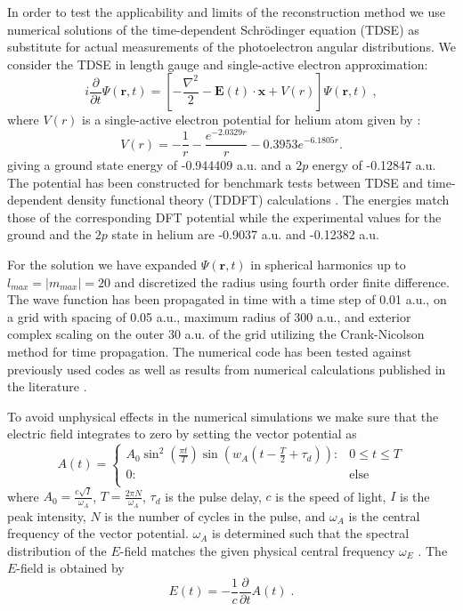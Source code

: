 In order to test the applicability and limits of the reconstruction method we use numerical solutions of the time-dependent Schr\"odinger equation (TDSE) as substitute for actual measurements of the photoelectron angular distributions. We consider the TDSE in length gauge and single-active electron approximation:
%
\begin{equation}
i\frac{\partial}{\partial t}\Psi(\mathbf{r},t) = \left[-\frac{\nabla^2}{2} - \mathbf{E}(t) \cdot \mathbf{x} + V(r)\right]\Psi(\mathbf{r},t)\; ,
\end{equation}
%
where $V(r)$ is a single-active electron potential for helium atom given by \cite{reiff2020}:
%
\begin{equation}
V(r) = -\frac{1}{r} - \frac{e^{-2.0329r}}{r} - 0.3953 e^{-6.1805r}.
\end{equation}
%
giving a ground state energy of -0.944409 a.u. and a $2p$ energy of -0.12847 a.u. The potential has been constructed for benchmark tests between TDSE and time-dependent density functional theory (TDDFT) calculations \cite{reiff2020}. The energies match those of the corresponding DFT potential while the experimental values for the ground and the $2p$ state in helium are -0.9037 a.u. and -0.12382 a.u.

For the solution we have expanded $\Psi(\mathbf{r},t)$ in spherical harmonics up to $l_{max} = |m_{max}| = 20$ and discretized the radius using fourth order finite difference. The wave function has been propagated in time with a time step of 0.01 a.u., on a grid with spacing of 0.05 a.u., maximum radius of 300 a.u., and exterior complex scaling on the outer 30 a.u. of the grid utilizing the Crank-Nicolson method for time propagation. The numerical code has been tested against previously used codes as well as results from numerical calculations published in the literature \cite{Scrinzi2010}.

To avoid unphysical effects in the numerical simulations we make sure that the electric field integrates to zero by setting the vector potential as \cite{chelkowski2002}
%
\begin{equation}
A(t) = \begin{cases} 
      A_0 \sin^2\left(\frac{\pi t}{T}\right)\sin(w_A(t-\frac{T}{2}+\tau_d)): & 0\leq t \leq T \\
      0: & \mbox{else} \\
   \end{cases} 
\end{equation}
%
where $A_0 = \frac{c\sqrt{I}}{\omega_A}$, $T = \frac{2\pi N}{\omega_A}$, $\tau_d$ is the pulse delay, $c$ is the speed of light, $I$ is the peak intensity, $N$ is the number of cycles in the pulse, and $\omega_A$ is the central frequency of the vector potential. $\omega_A$ is determined such that the spectral distribution of the $E$-field matches the given physical central frequency $\omega_E$ \cite{venzke2018_Central}. The $E$-field is obtained by
%
\begin{equation}
    E(t) = -\frac{1}{c}\frac{\partial}{\partial t}A(t)\; .
\end{equation}

